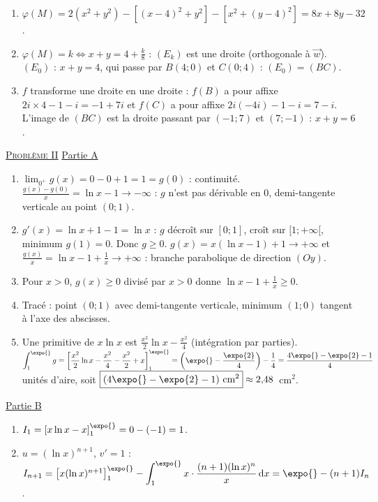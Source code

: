 \begin{corrige}
\begin{enumerate}
      vecteur constant d'affixe $-4 - 4i$.
\item $\varphi(M) = 2(x^2 + y^2) - \left[(x - 4)^2 + y^2\right] - \left[x^2 + (y - 4)^2\right] = 8x + 8y - 32$.
\item $\varphi(M) = k \iff x + y = 4 + \frac{k}{8}$ : $(E_k)$ est une droite (orthogonale \`a $\vec{w}$).
      $(E_0)$ : $x + y = 4$, qui passe par $B(4 ; 0)$ et $C(0 ; 4)$ : $(E_0) = (BC)$.
\item $f$ transforme une droite en une droite : $f(B)$ a pour affixe $2i \times 4 - 1 - i = -1 + 7i$ et $f(C)$ a pour affixe $2i(-4i) - 1 - i = 7 - i$.
      L'image de $(BC)$ est la droite passant par $(-1 ; 7)$ et $(7 ; -1)$ : $x + y = 6$.
\end{enumerate}

\noindent \underline{\textsc{Probl\`eme II}} \newline
\underline{Partie A}
\begin{enumerate}
\item $\lim_{0^+} g(x) = 0 - 0 + 1 = 1 = g(0)$ : continuit\'e. $\frac{g(x) - g(0)}{x} = \ln x - 1 \to -\infty$ : $g$ n'est pas d\'erivable en $0$,
      demi-tangente verticale au point $(0 ; 1)$.
\item $g'(x) = \ln x + 1 - 1 = \ln x$ : $g$ d\'ecro\^it sur $[0 ; 1]$, cro\^it sur $[1 ; +\infty[$, minimum $g(1) = 0$. Donc $g \geq 0$.
      $g(x) = x(\ln x - 1) + 1 \to +\infty$ et $\frac{g(x)}{x} = \ln x - 1 + \frac{1}{x} \to +\infty$ : branche parabolique de direction $(Oy)$.
\item Pour $x > 0$, $g(x) \geq 0$ divis\'e par $x > 0$ donne $\ln x - 1 + \frac{1}{x} \geq 0$.
\item Trac\'e : point $(0 ; 1)$ avec demi-tangente verticale, minimum $(1 ; 0)$ tangent \`a l'axe des abscisses.
\item Une primitive de $x\ln x$ est $\frac{x^2}{2}\ln x - \frac{x^2}{4}$ (int\'egration par parties).
      $\displaystyle\int_1^{\expo{}} g = \left[\frac{x^2}{2}\ln x - \frac{x^2}{4} - \frac{x^2}{2} + x\right]_1^{\expo{}}
      = \left(\expo{} - \frac{\expo{2}}{4}\right) - \frac{1}{4} = \frac{4\expo{} - \expo{2} - 1}{4}$ unit\'es d'aire, soit
      $\boxed{(4\expo{} - \expo{2} - 1) \text{ cm}^2} \approx 2{,}48$~cm$^2$.
\end{enumerate}
\underline{Partie B}
\begin{enumerate}
\item $I_1 = \left[x\ln x - x\right]_1^{\expo{}} = 0 - (-1) = 1$.
\item $u = (\ln x)^{n+1}$, $v' = 1$ : $I_{n+1} = \left[x(\ln x)^{n+1}\right]_1^{\expo{}} - \displaystyle\int_1^{\expo{}} x \cdot \frac{(n+1)(\ln x)^n}{x}\,\mathrm{d}x = \expo{} - (n+1)I_n$.

\end{enumerate}
\end{corrige}
